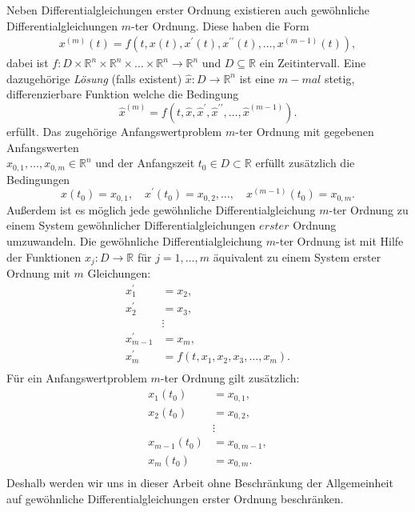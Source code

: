 \begin{bem}
    \label{ode-mter-ordnung-bem}
    Neben Differentialgleichungen erster Ordnung existieren auch gewöhnliche Differentialgleichungen $m$-ter Ordnung.
    Diese haben die Form
    \begin{align}
        x^{(m)}(t) = f(t, x(t), x^{\prime}(t), x^{\prime\prime}(t), \dots, x^{(m-1)}(t)),
    \end{align}
    dabei ist
    $
    f : D \times \mathbb{R}^{n} \times \mathbb{R}^{n} \times \dots \times \mathbb{R}^{n} \rightarrow \mathbb{R}^{n}
    $
    und $D \subseteq \mathbb{R}$ ein Zeitintervall. Eine dazugehörige \textit{Lösung} (falls existent)
    $\hat{x} : D \rightarrow \mathbb{R}^n$ ist eine $m-mal$ stetig, differenzierbare Funktion welche die Bedingung
    \[
        \hat{x}^{(m)} = f(t, \hat{x},\hat{x}^{\prime},\hat{x}^{\prime\prime}, \dots,\hat{x}^{(m-1)}).
    \]
    erfüllt. Das zugehörige Anfangswertproblem $m$-ter Ordnung mit gegebenen Anfangswerten \\
    $x_{0,1},\dots,x_{0,m} \in \mathbb{R}^{n}$ und der Anfangszeit $t_0 \in D \subset \mathbb{R}$ erfüllt zusätzlich die
    Bedingungen \[
        x(t_{0})=x_{0,1},\quad x^{\prime}(t_{0})=x_{0,2},\dots,\quad x^{(m-1)}(t_{0})=x_{0,m}.
    \]
    Außerdem ist es möglich jede gewöhnliche Differentialgleichung $m$-ter Ordnung zu einem System gewöhnlicher
    Differentialgleichungen $erster$ Ordnung umzuwandeln. Die gewöhnliche Differentialgleichung $m$-ter Ordnung ist mit
    Hilfe der Funktionen $x_{j}:D \rightarrow \mathbb{R}$ für $j = 1,\dots,m$ äquivalent zu einem System erster Ordnung mit $m$
    Gleichungen:
    \begin{align}
        x_{1}^{\prime}&=x_{2}, \nonumber \\
        x_{2}^{\prime}&=x_{3}, \nonumber \\
        &\vdots\\
        x_{m-1}^{\prime}&=x_{m}, \nonumber \\
        x_{m}^{\prime}&=f(t, x_{1}, x_{2}, x_{3}, \ldots, x_{m}). \nonumber \\ \nonumber
    \end{align}
    Für ein Anfangswertproblem $m$-ter Ordnung gilt zusätzlich:
    \begin{align}
        x_{1}(t_{0})&=x_{0,1}, \nonumber \\
        x_{2}(t_{0})&=x_{0,2}, \nonumber \\
        &\vdots \\
        x_{m-1}(t_{0})&=x_{0,m-1}, \nonumber \\
        x_{m}(t_{0})&=x_{0,m}. \nonumber \\ \nonumber
    \end{align}
    Deshalb werden wir uns in dieser Arbeit ohne Beschränkung der Allgemeinheit auf gewöhnliche Differentialgleichungen
    erster Ordnung beschränken.
\end{bem}
